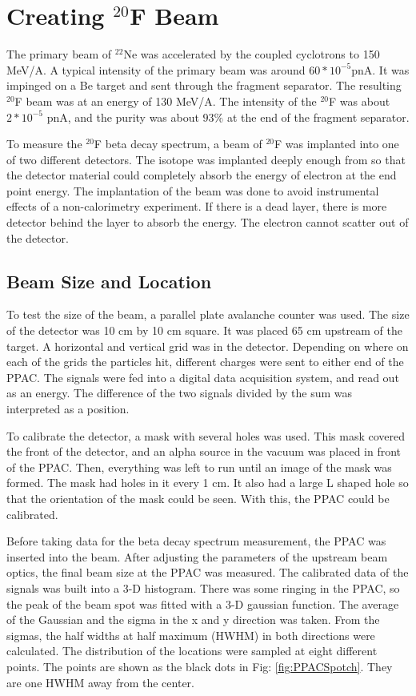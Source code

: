 \section{Creating $^{20}$F Beam}

The primary beam of $^{22}$Ne was accelerated by the coupled cyclotrons to 150 MeV/A. 
A typical intensity of the primary beam was around $60 * 10^{-5}$pnA.
It was impinged on a Be target and sent through the fragment separator. 
The resulting $^{20}$F beam was at an energy of 130 MeV/A. 
The intensity of the $^{20}$F was about $2 * 10^{-5}$ pnA, and the purity was about $93\%$ at the end of the fragment separator.

To measure the $^{20}$F beta decay spectrum, a beam of $^{20}$F was implanted into one of two different detectors.
The isotope was implanted deeply enough from so that the detector material could completely absorb the energy of electron at the end point energy.
The implantation of the beam was done to avoid instrumental effects of a non-calorimetry experiment.
If there is a dead layer, there is more detector behind the layer to absorb the energy.
The electron cannot scatter out of the detector.

\subsection{Beam Size and Location}
To test the size of the beam, a parallel plate avalanche counter was used.
The size of the detector was 10 cm by 10 cm square. 
It was placed 65 cm upstream of the target.
A horizontal and vertical grid was in the detector.
Depending on where on each of the grids the particles hit, different charges were sent to either end of the PPAC.
The signals were fed into a digital data acquisition system, and read out as an energy.
The difference of the two signals divided by the sum was interpreted as a position.

To calibrate the detector, a mask with several holes was used. 
This mask covered the front of the detector, and an alpha source in the vacuum was placed in front of the PPAC.
Then, everything was left to run until an image of the mask was formed.
The mask had holes in it every 1 cm. 
It also had a large L shaped hole so that the orientation of the mask could be seen. 
With this, the PPAC could be calibrated.

Before taking data for the beta decay spectrum measurement, the PPAC was inserted into the beam.
After adjusting the parameters of the upstream beam optics, the final beam size at the PPAC was measured.
The calibrated data of the signals was built into a 3-D histogram.
There was some ringing in the PPAC, so the peak of the beam spot was fitted with a 3-D gaussian function.
The average of the Gaussian and the sigma in the x and y direction was taken. 
From the sigmas, the half widths at half maximum (HWHM) in both directions were calculated. 
The distribution of the locations were sampled at eight different points. 
The points are shown as the black dots in Fig: \ref{fig:PPACSpotch}.
They are one HWHM away from the center. 

